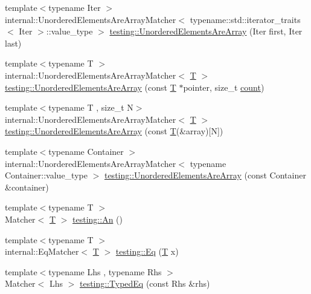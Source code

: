 \begin{DoxyCompactItemize}
\item 
{\footnotesize template$<$typename Iter $>$ }\\internal\+::\+Unordered\+Elements\+Are\+Array\+Matcher$<$ typename\+::std\+::iterator\+\_\+traits$<$ Iter $>$\+::value\+\_\+type $>$ \hyperlink{namespacetesting_ab4896081406209171a1596b7028e1cf7}{testing\+::\+Unordered\+Elements\+Are\+Array} (Iter first, Iter last)
\item 
{\footnotesize template$<$typename T $>$ }\\internal\+::\+Unordered\+Elements\+Are\+Array\+Matcher$<$ \hyperlink{functions__7_8js_adf1f3edb9115acb0a1e04209b7a9937b}{T} $>$ \hyperlink{namespacetesting_a99b9509a7cd405be28bf45231577384b}{testing\+::\+Unordered\+Elements\+Are\+Array} (const \hyperlink{functions__7_8js_adf1f3edb9115acb0a1e04209b7a9937b}{T} $\ast$pointer, size\+\_\+t \hyperlink{gmock__stress__test_8cc_afd9db40e3361ae09188795e8cbe19752}{count})
\item 
{\footnotesize template$<$typename T , size\+\_\+t N$>$ }\\internal\+::\+Unordered\+Elements\+Are\+Array\+Matcher$<$ \hyperlink{functions__7_8js_adf1f3edb9115acb0a1e04209b7a9937b}{T} $>$ \hyperlink{namespacetesting_a23c7729cfc61967f3271018076c4b724}{testing\+::\+Unordered\+Elements\+Are\+Array} (const \hyperlink{functions__7_8js_adf1f3edb9115acb0a1e04209b7a9937b}{T}(\&array)\mbox{[}N\mbox{]})
\item 
{\footnotesize template$<$typename Container $>$ }\\internal\+::\+Unordered\+Elements\+Are\+Array\+Matcher$<$ typename Container\+::value\+\_\+type $>$ \hyperlink{namespacetesting_a72b0ee2217293106fcf4971dc4a59f4c}{testing\+::\+Unordered\+Elements\+Are\+Array} (const Container \&container)
\item 
{\footnotesize template$<$typename T $>$ }\\Matcher$<$ \hyperlink{functions__7_8js_adf1f3edb9115acb0a1e04209b7a9937b}{T} $>$ \hyperlink{namespacetesting_a48792471ff9cdf5b4f95a4242df7bfbb}{testing\+::\+An} ()
\item 
{\footnotesize template$<$typename T $>$ }\\internal\+::\+Eq\+Matcher$<$ \hyperlink{functions__7_8js_adf1f3edb9115acb0a1e04209b7a9937b}{T} $>$ \hyperlink{namespacetesting_a0cb8ba7eae844c871eccb29e7c81635f}{testing\+::\+Eq} (\hyperlink{functions__7_8js_adf1f3edb9115acb0a1e04209b7a9937b}{T} x)
\item 
{\footnotesize template$<$typename Lhs , typename Rhs $>$ }\\Matcher$<$ Lhs $>$ \hyperlink{namespacetesting_a57c9aba17aaa27d818e80a1eec81070f}{testing\+::\+Typed\+Eq} (const Rhs \&rhs)

\end{DoxyCompactItemize}
